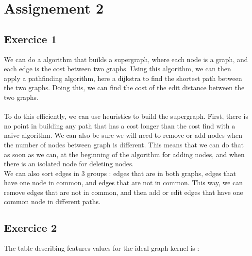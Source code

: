 \documentclass{article}
\begin{document}
    \section{Assignement 2}

    \subsection{Exercice 1}

    We can do a algorithm that builds a supergraph, where each node is a graph, and each edge is the cost between two graphs.
    Using this algorithm, we can then apply a pathfinding algorithm, here a dijkstra to find the shortest path between the two graphs. Doing this, we can find the cost of the edit distance between the two graphs.  \\
    \\
    To do this efficiently, we can use heuristics to build the supergraph.
    First, there is no point in building any path that has a cost longer than the cost find with a naive algorithm.
    We can also be sure we will need to remove or add nodes when the number of nodes between graph is different.
    This means that we can do that as soon as we can, at the beginning of the algorithm for adding nodes, and when there is an isolated node for deleting nodes. \\
    We can also sort edges in 3 groups : edges that are in both graphs, edges that have one node in common, and edges that are not in common.
    This way, we can remove edges that are not in common, and then add or edit edges that have one common node in different paths. \\

    \subsection{Exercice 2}

    The table describing features values for the ideal graph kernel is :
\end{document}
